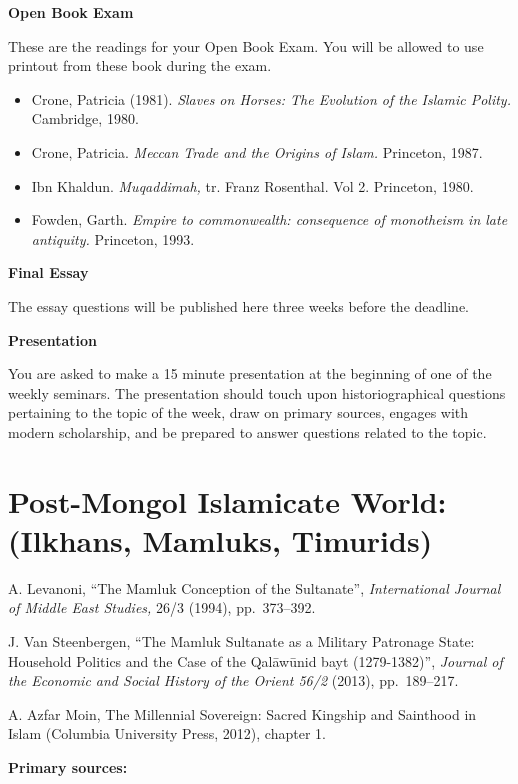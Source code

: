 \documentclass[
]{book}
\begin{document}
\textbf{Open Book Exam}

These are the readings for your Open Book Exam. You will be allowed to use printout from these book during the exam.

\begin{itemize}
\item
  Crone, Patricia (1981). \emph{Slaves on Horses: The Evolution of the Islamic Polity.} Cambridge, 1980.
\item
  Crone, Patricia. \emph{Meccan Trade and the Origins of Islam.} Princeton, 1987.
\item
  Ibn Khaldun. \emph{Muqaddimah,} tr. Franz Rosenthal. Vol 2. Princeton, 1980.
\item
  Fowden, Garth. \emph{Empire to commonwealth: consequence of monotheism in late antiquity.} Princeton, 1993.
\end{itemize}

\textbf{Final Essay}

The essay questions will be published here three weeks before the deadline.

\textbf{Presentation}

You are asked to make a 15 minute presentation at the beginning of one of the weekly seminars. The presentation should touch upon historiographical questions pertaining to the topic of the week, draw on primary sources, engages with modern scholarship, and be prepared to answer questions related to the topic.

\hypertarget{post-mongol-islamicate-world-ilkhans-mamluks-timurids}{%
\chapter{Post-Mongol Islamicate World: (Ilkhans, Mamluks, Timurids)}\label{post-mongol-islamicate-world-ilkhans-mamluks-timurids}}

A. Levanoni, ``The Mamluk Conception of the Sultanate'', \emph{International Journal of Middle East Studies,} 26/3 (1994), pp.~373--392.

J. Van Steenbergen, ``The Mamluk Sultanate as a Military Patronage State: Household Politics and the Case of the Qalāwūnid bayt (1279-1382)'', \emph{Journal of the Economic and Social History of the Orient 56/2} (2013), pp.~189--217.

A. Azfar Moin, The Millennial Sovereign: Sacred Kingship and Sainthood in Islam (Columbia University Press, 2012), chapter 1.

\textbf{Primary sources:}
\end{document}
